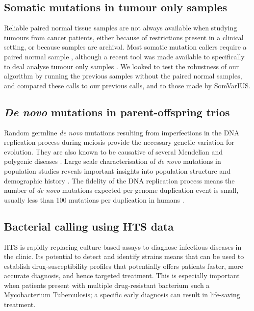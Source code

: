 \documentclass[notitlepage, twocolumn]{article}
\begin{document}
\subsection*{Somatic mutations in tumour only samples}

Reliable paired normal tissue samples are not always available when studying tumours from cancer patients, either because of restrictions present in a clinical setting, or because samples are archival. Most somatic mutation callers require a paired normal sample \cite{RN142, RN146, RN150, RN143, RN145}, although a recent tool was made available to specifically to deal analyse tumour only samples \cite{RN161}. We looked to test the robustness of our algorithm by running the previous samples without the paired normal samples, and compared these calls to our previous calls, and to those made by SomVarIUS.

\subsection*{\emph{De novo} mutations in parent-offspring trios}

Random germline \emph{de novo} mutations resulting from imperfections in the DNA replication process during meiosis provide the necessary genetic variation for evolution. They are also known to be causative of several Mendelian and polygenic diseases \cite{RN157, RN160, RN159}. Large scale characterisation of \emph{de novo} mutations in population studies reveals important insights into population structure and demographic history \cite{RN158}. The fidelity of the DNA replication process means the number of \emph{de novo} mutations expected per genome duplication event is small, usually less than 100 mutations per duplication in humans \cite{RN6}.

\subsection*{Bacterial calling using HTS data}

HTS is rapidly replacing culture based assays to diagnose infectious diseases in the clinic. Its potential to detect and identify strains means that can be used to establish drug-susceptibility profiles that potentially offers patients faster, more accurate diagnosis, and hence targeted treatment. This is especially important when patients present with multiple drug-resistant bacterium such a Mycobacterium Tuberculosis; a specific early diagnosis can result in life-saving treatment.
\end{document}
